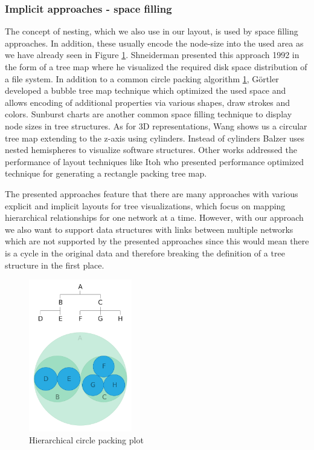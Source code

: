 \subsubsection{Implicit approaches - space filling}
The concept of nesting, which we also use in our layout, is used by space filling approaches. In addition, these usually encode the node-size into the used area as we have already seen in Figure \ref{fig:hierarchicalCirclePlot}.
Shneiderman \cite{shneiderman_tree_1992} presented this approach 1992 in the form of a tree map where he visualized the required disk space distribution of a file system. In addition to a common circle packing algorithm \ref{fig:hierarchicalCirclePlot}, Görtler \cite{gortler_bubble_2018} developed a bubble tree map technique which optimized the used space and allows encoding of additional properties via various shapes, draw strokes and colors. Sunburst charts are another common space filling technique to display node sizes in tree structures. 
As for 3D representations, Wang \cite{wang_visualization_2006} shows us a circular tree map extending to the z-axis using cylinders. Instead of cylinders Balzer \cite{balzer_hierarchy_2004} uses nested hemispheres to visualize software structures.
Other works addressed the performance of layout techniques like Itoh \cite{itoh_hierarchical_2004} who presented performance optimized technique for generating a rectangle packing tree map.

The presented approaches feature that there are many approaches with various explicit and implicit layouts for tree visualizations, which focus on mapping hierarchical relationships for one network at a time. However, with our approach we also want to support data structures with links between multiple networks which are not supported by the presented approaches since this would mean there is a cycle in the original data and therefore breaking the definition of a tree structure in the first place.

\begin{figure}[h]
    \centering
    \includegraphics[width=0.40\textwidth, trim={0 0 0 4.3cm},clip]{graphics/circle_packing.pdf}
    \caption{Hierarchical circle packing plot \cite{ribecca_circle_nodate}}
    \label{fig:hierarchicalCirclePlot}
\end{figure}

